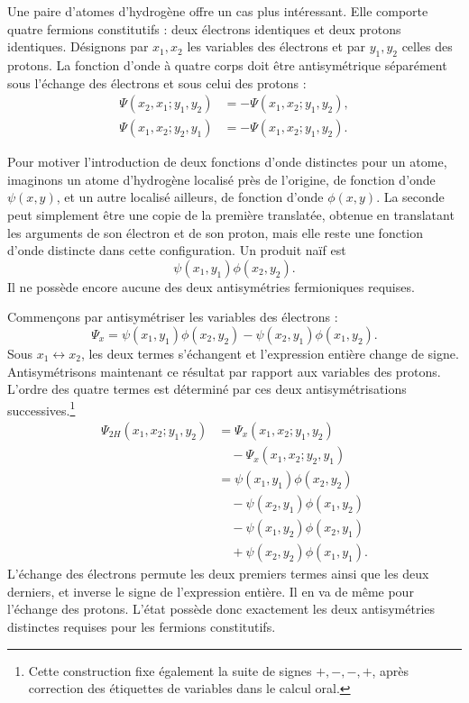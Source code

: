 Une paire d’atomes d’hydrogène offre un cas plus intéressant. Elle comporte quatre fermions constitutifs : deux électrons identiques et deux protons identiques. Désignons par \(x_1,x_2\) les variables des électrons et par \(y_1,y_2\) celles des protons. La fonction d’onde à quatre corps doit être antisymétrique séparément sous l’échange des électrons et sous celui des protons :
\begin{align}
\Psi(x_2,x_1;y_1,y_2)
&=-\Psi(x_1,x_2;y_1,y_2),\\
\Psi(x_1,x_2;y_2,y_1)
&=-\Psi(x_1,x_2;y_1,y_2).
\end{align}

Pour motiver l’introduction de deux fonctions d’onde distinctes pour un atome, imaginons un atome d’hydrogène localisé près de l’origine, de fonction d’onde \(\psi(x,y)\), et un autre localisé ailleurs, de fonction d’onde \(\phi(x,y)\). La seconde peut simplement être une copie de la première translatée, obtenue en translatant les arguments de son électron et de son proton, mais elle reste une fonction d’onde distincte dans cette configuration. Un produit naïf est
\begin{equation}
\psi(x_1,y_1)\phi(x_2,y_2).
\end{equation}
Il ne possède encore aucune des deux antisymétries fermioniques requises.

Commençons par antisymétriser les variables des électrons :
\begin{equation}
\Psi_x=
\psi(x_1,y_1)\phi(x_2,y_2)
-\psi(x_2,y_1)\phi(x_1,y_2).
\end{equation}
Sous \(x_1\leftrightarrow x_2\), les deux termes s’échangent et l’expression entière change de signe. Antisymétrisons maintenant ce résultat par rapport aux variables des protons. L’ordre des quatre termes est déterminé par ces deux antisymétrisations successives.\footnote{Cette construction fixe également la suite de signes \(+,-,-,+\), après correction des étiquettes de variables dans le calcul oral.}
\begin{align}
\Psi_{2H}(x_1,x_2;y_1,y_2)
&=\Psi_x(x_1,x_2;y_1,y_2)\nonumber\\
&\quad{}-\Psi_x(x_1,x_2;y_2,y_1)\\
&=\psi(x_1,y_1)\phi(x_2,y_2)\nonumber\\
&\quad{}-\psi(x_2,y_1)\phi(x_1,y_2)\nonumber\\
&\quad{}-\psi(x_1,y_2)\phi(x_2,y_1)\nonumber\\
&\quad{}+\psi(x_2,y_2)\phi(x_1,y_1).
\label{eq:two-hydrogen-antisymmetrized}
\end{align}
L’échange des électrons permute les deux premiers termes ainsi que les deux derniers, et inverse le signe de l’expression entière. Il en va de même pour l’échange des protons. L’état possède donc exactement les deux antisymétries distinctes requises pour les fermions constitutifs.


